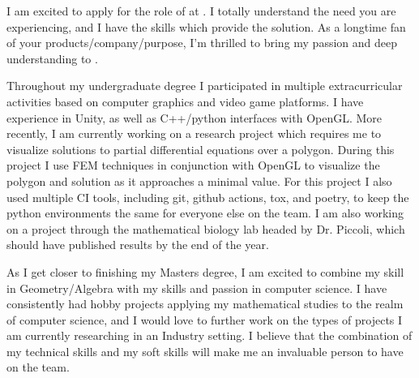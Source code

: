 
I am excited to apply for the role of \myPosition at \myEmployer.
I totally understand the need you are experiencing, and I have the skills which provide the solution.
As a longtime fan of your products/company/purpose, I'm thrilled to bring my passion and deep understanding to \myEmployer.

Throughout my undergraduate degree I participated in multiple extracurricular activities based on computer graphics and video game platforms.
I have experience in Unity, as well as C++/python interfaces with OpenGL.
More recently, I am currently working on a research project which requires me to visualize solutions to partial differential equations over a polygon.
During this project I use FEM techniques in conjunction with OpenGL to visualize the polygon and solution as it approaches a minimal value.
For this project I also used multiple CI tools, including git, github actions, tox, and poetry, to keep the python environments the same for everyone else on the team.
I am also working on a project through the mathematical biology lab headed by Dr. Piccoli, which should have published results by the end of the year. 

As I get closer to finishing my Masters degree, I am excited to combine my skill in Geometry/Algebra with my skills and passion in computer science.
I have consistently had hobby projects applying my mathematical studies to the realm of computer science, and I would love to further work on the types of projects I am currently researching in an Industry setting.
I believe that the combination of my technical skills and my soft skills will make me an invaluable person to have on the team.
